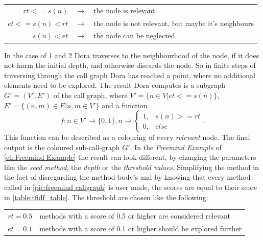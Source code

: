 \vspace{2em} %
\begin{table}[h]
	\centering
	\begin{tabular}{r c l}
		$rt <= s(n)$ & $\rightarrow$ & the node is relevant\\
		$et <= s(n) < rt$ & $\rightarrow$ & the node is not relevant, but maybe it's neighbours \\
		$s(n) < et$ & $\rightarrow$ & the node can be neglected
	\end{tabular}
\end{table}

In the case of 1 and 2 Dora traverses to the neighbourhood of the node, if it does not harm the initial depth, and otherwise discards the node. So in finite steps of traversing through the call graph Dora has reached a point, where no additional elements need to be explored.\newline
The result Dora computes is a subgraph $G'=(V',E')$ of the call graph, where $V' = \{ n \in V | et <= s(n) \}$, $E' = \{ (n,m) \in E | n,m \in V' \}$ and a function \newline
\[
	f: n\in V' \rightarrow \{0,1\},n \rightarrow 
		\left\{
			\begin{array}{ll} 
				1, & s(n) >= rt \\
				0, & else 
			\end{array}\right. .
\]
This function can be described as a colouring of every \textit{relevant} node. The final output is the coloured sub-call-graph $G'$. \newline
\emptyLine
In the \textit{Freemind Example} of \autoref{ch:Freemind Example} the result can look different, by changing the parameters like the \textit{seed method}, the \textit{depth} or the \textit{threshold values}.
\newline
Simplifying the method in the fact of disregarding the method body's and by knowing that every method called in \autoref{pic:freemind callgraph} is user made, the scores are equal to their score in \autoref{table:tfidf_table}. \newline
The threshold are chosen like the following:
\begin{table}[h]
	\centering
	\begin{tabular}{r l}
		$rt = 0.5$ & methods with a score of 0.5 or higher are considered relevant \\
		$et = 0.1$ & methods with a score of 0.1 or higher should be explored further
	\end{tabular}
\end{table}


